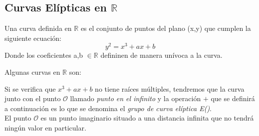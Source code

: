 \subsection{Curvas Elípticas en $\mathbb{R}$}
\begin{definicion}
	Una curva definida en $\mathbb{R}$ es el conjunto de puntos del plano (x,y) que cumplen la siguiente ecuación:
$$
	y^2=x^3+ax+b
$$
Donde los coeficientes a,b $\in \mathbb{R}$ defininen de manera unívoca a la curva.
\end{definicion}
Algunas curvas en $\mathbb{R}$ son:

\begin{figure}[H]
	\centering
	\qquad
\end{figure}

Si se verifica que $x^3+ax+b$ no tiene raíces múltiples, tendremos que la curva junto con 
el punto $\mathcal{O}$ llamado \emph{punto en el infinito} y la operación $+$ que se definirá 
a continuación es lo que se denomina el \emph{grupo de curva elíptica E()}.\\
El punto $\mathcal{O}$ es un punto imaginario situado a una distancia infinita que no tendrá ningún valor en particular.\\

